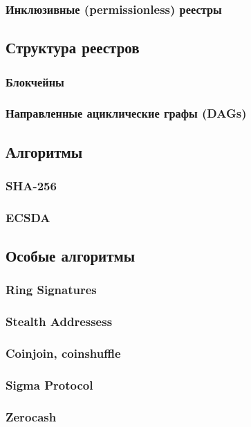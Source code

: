 \subsubsection{Инклюзивные (permissionless) реестры}


\subsection{Структура реестров}
\subsubsection{Блокчейны}
\subsubsection{Направленные ациклические графы (DAGs)}


\subsection{Алгоритмы}
\subsubsection{SHA-256}
\subsubsection{ECSDA}


\subsection{Особые алгоритмы}
\subsubsection{Ring Signatures}
\subsubsection{Stealth Addressess}
\subsubsection{Coinjoin, coinshuffle}
\subsubsection{Sigma Protocol}
\subsubsection{Zerocash}
